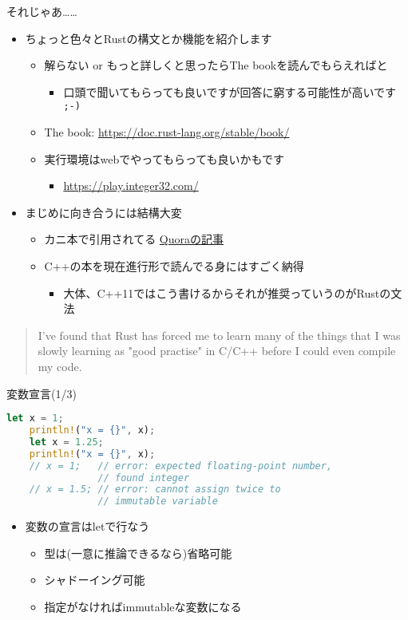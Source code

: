 \documentclass[cjk,dvipdfmx,10pt,compress,t,fragile%
hyperref={bookmarks=true,bookmarksnumbered=true,bookmarksopen=false,%
colorlinks=false,%
pdftitle={第 134 回 関西 Debian 勉強会},%
pdfauthor={小林},%
pdfsubject={資料},%
}]{beamer}
\begin{document}
\begin{frame}[fragile]{それじゃあ……}
\begin{itemize}
 \item ちょっと色々とRustの構文とか機能を紹介します
       \begin{itemize}
	\item 解らない or もっと詳しくと思ったらThe bookを読んでもらえればと
	      \begin{itemize}
	       \item 口頭で聞いてもらっても良いですが回答に窮する可能性が高いです \verb|;-)|
	      \end{itemize}
	\item The book: \url{https://doc.rust-lang.org/stable/book/}
	\item 実行環境はwebでやってもらっても良いかもです
	      \begin{itemize}
	       \item \url{https://play.integer32.com/}
	      \end{itemize}
       \end{itemize}
 \item まじめに向き合うには結構大変
       \begin{itemize}
	\item カニ本で引用されてる
	      \href{https://www.quora.com/What-do-C-C++-systems-programmers-think-of-Rust/answer/Mitchell-Nordine}{Quoraの記事}
	\item C++の本を現在進行形で読んでる身にはすごく納得
	      \begin{itemize}
	       \item 大体、C++11ではこう書けるからそれが推奨っていうのがRustの文法
	      \end{itemize}
       \end{itemize}
\end{itemize}
\begin{quote}
I've found that Rust has forced me to learn many of the things that I was slowly learning as "good practise" in C/C++ before I could even compile my code.
\end{quote}
\end{frame}

\begin{frame}[fragile]{変数宣言(1/3)}
\begin{lstlisting}[language=Rust,style=boxed,style=colouredRust]
    let x = 1;
    println!("x = {}", x);
    let x = 1.25;
    println!("x = {}", x);
    // x = 1;   // error: expected floating-point number,
                // found integer
    // x = 1.5; // error: cannot assign twice to
                // immutable variable\end{lstlisting}
\begin{itemize}
 \item 変数の宣言はletで行なう
       \begin{itemize}
	\item 型は(一意に推論できるなら)省略可能
	\item シャドーイング可能
	\item 指定がなければimmutableな変数になる
       \end{itemize}
\end{itemize}
\end{frame}
\end{document}
